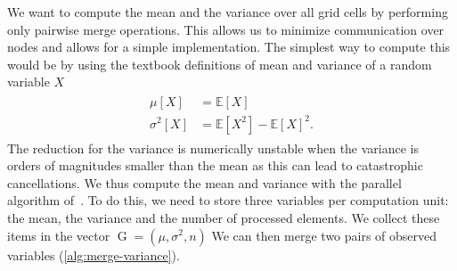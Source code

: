 \newcommand{\gobs}{\operatorname{G}}
\newcommand{\mean}{\mu}
\newcommand{\std}{\sigma}
\newcommand{\variance}{\std^2}
\newcommand{\gobsCount}{n}
We want to compute the mean and the variance over all grid cells by performing only pairwise merge operations.
This allows us to minimize communication over nodes and allows for a simple implementation.
The simplest way to compute this would be by using the textbook definitions of mean and variance of a random variable $X$
\newcommand{\expectation}{\mathbb{E}}
\begin{align}
  \begin{split}
    \mu [X] &= \expectation \left[ X \right]\\
    \variance [X] &= \expectation \left[ X^2 \right] - \expectation \left[ X \right]^2.
  \end{split}
\end{align}
The reduction for the variance is numerically unstable when the variance is orders of magnitudes smaller than the mean as this can lead to catastrophic cancellations.
We thus compute the mean and variance with the parallel algorithm of~\cite{chan1982updating}.
To do this, we need to store three variables per computation unit:
the mean, the variance and the number of processed elements.
We collect these items in the vector $\gobs = (\mean, \variance, \gobsCount)$
We can then merge two pairs of observed variables (\cref{alg:merge-variance}).

